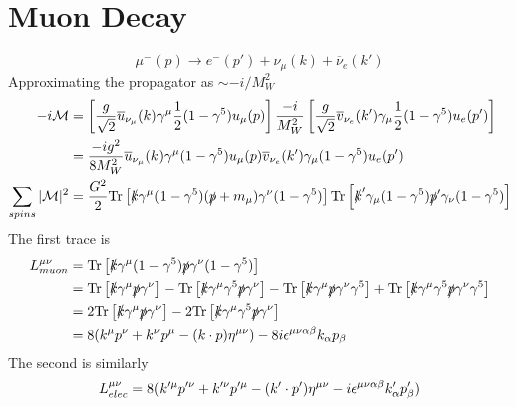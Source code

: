 \documentclass[12pt]{article}
\newcommand{\tr}{\text{Tr}}
\theoremstyle{definition}
\begin{document}
\section{Muon Decay}
\begin{equation*}
    \mu^-(p) \to e^-(p') + \nu_\mu(k) + \overline{\nu}_{e}(k')
\end{equation*}
Approximating the propagator as $\sim -i/M_W^2$
\begin{equation*}
\begin{split}
    -i\mathcal{M}
        &= \left[ \frac{g}{\sqrt{2}} \overline{u}_{\nu_\mu}(k) \gamma^\mu \frac{1}{2} ( 1 - \gamma^5 ) u_\mu(p) \right] \frac{-i}{M_W^2} \left[ \frac{g}{\sqrt{2}} \overline{v}_{\nu_e}(k') \gamma_\mu \frac{1}{2}(1 - \gamma^5) u_{e}(p') \right] \\
        &= \frac{-ig^2}{8M_W^2} \overline{u}_{\nu_\mu}(k) \gamma^\mu (1 - \gamma^5) u_\mu(p) \overline{v}_{\nu_e}(k') \gamma_\mu (1 - \gamma^5) u_e(p') \\
    \sum_{spins} |\mathcal{M}|^2
        &= \frac{G^2}{2} \text{Tr} \left[ \slashed{k} \gamma^\mu (1-\gamma^5) (\slashed{p} + m_\mu) \gamma^\nu (1 - \gamma^5) \right] \tr \left[ \slashed{k}' \gamma_\mu ( 1 - \gamma^5) \slashed{p}' \gamma_\nu ( 1 - \gamma^5) \right] \\
\end{split}
\end{equation*}
The first trace is
\begin{equation*}
\begin{split}
    L_{muon}^{\mu\nu}
        &= \tr \left[ \slashed{k} \gamma^\mu (1 - \gamma^5) \slashed{p} \gamma^\nu (1 - \gamma^5) \right] \\
        &= \tr \left[ \slashed{k} \gamma^\mu \slashed{p} \gamma^\nu \right] - \tr \left[ \slashed{k} \gamma^\mu \gamma^5 \slashed{p} \gamma^\nu \right] - \tr \left[ \slashed{k} \gamma^\mu \slashed{p} \gamma^\nu \gamma^5 \right] + \tr \left[ \slashed{k} \gamma^\mu \gamma^5 \slashed{p} \gamma^\nu \gamma^5 \right] \\
        &= 2\tr \left[ \slashed{k} \gamma^\mu \slashed{p} \gamma^\nu \right] - 2\tr \left[ \slashed{k} \gamma^\mu \gamma^5 \slashed{p} \gamma^\nu \right] \\
        &= 8(k^\mu p^\nu + k^\nu p^\mu - (k \cdot p) \eta^{\mu\nu}) - 8i\epsilon^{\mu\nu\alpha\beta} k_\alpha p_\beta \\
\end{split}
\end{equation*}
The second is similarly
\begin{equation*}
    L_{elec}^{\mu\nu} = 8(k'^\mu p'^\nu + k'^\nu p'^\mu - (k' \cdot p')\eta^{\mu\nu} - i\epsilon^{\mu\nu\alpha\beta} k'_\alpha p'_\beta) \\
\end{equation*}
\end{document}
